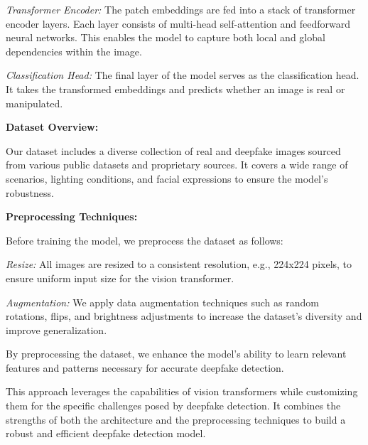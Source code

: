 \textit{Transformer Encoder:} The patch embeddings are fed into a stack of transformer encoder layers. Each layer consists of multi-head self-attention and feedforward neural networks. This enables the model to capture both local and global dependencies within the image.

\textit{Classification Head:} The final layer of the model serves as the classification head. It takes the transformed embeddings and predicts whether an image is real or manipulated.

\textbf{Dataset Overview:}

Our dataset includes a diverse collection of real and deepfake images sourced from various public datasets and proprietary sources. It covers a wide range of scenarios, lighting conditions, and facial expressions to ensure the model's robustness.

\textbf{Preprocessing Techniques:}

Before training the model, we preprocess the dataset as follows:

\textit{Resize:} All images are resized to a consistent resolution, e.g., 224x224 pixels, to ensure uniform input size for the vision transformer.

\textit{Augmentation:} We apply data augmentation techniques such as random rotations, flips, and brightness adjustments to increase the dataset's diversity and improve generalization.

By preprocessing the dataset, we enhance the model's ability to learn relevant features and patterns necessary for accurate deepfake detection.

This approach leverages the capabilities of vision transformers while customizing them for the specific challenges posed by deepfake detection. It combines the strengths of both the architecture and the preprocessing techniques to build a robust and efficient deepfake detection model.

